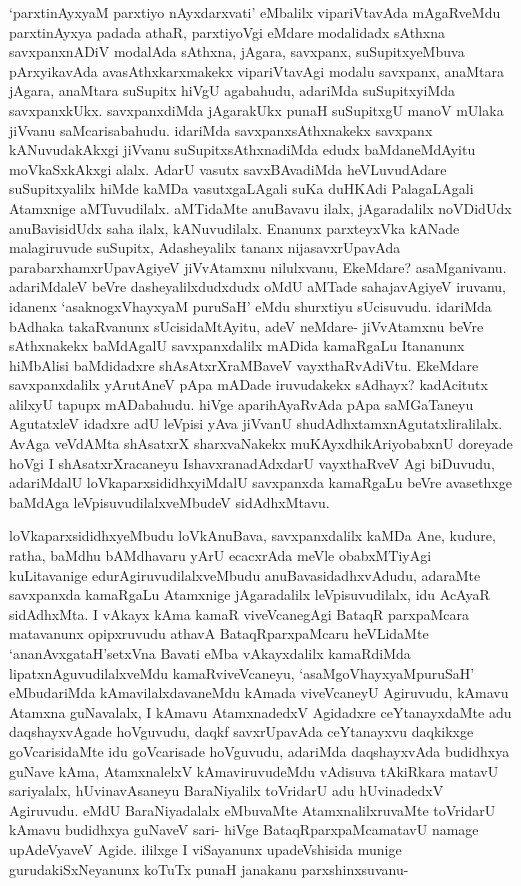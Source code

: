 \begin{artha}
`parxtinAyxyaM parxtiyo nAyxdarxvati' eMbalilx vipariVtavAda mAgaRveMdu parxtinAyxya padada athaR, parxtiyoVgi eMdare modalidadx sAthxna savxpanxnADiV modalAda sAthxna, jAgara, savxpanx, suSupitxyeMbuva pArxyikavAda avasAthxkarxmakekx vipariVtavAgi modalu savxpanx, anaMtara jAgara, anaMtara suSupitx hiVgU agabahudu, adariMda suSupitxyiMda savxpanxkUkx. savxpanxdiMda jAgarakUkx punaH suSupitxgU manoV mUlaka jiVvanu saMcarisabahudu. idariMda savxpanxsAthxnakekx savxpanx kANuvudakAkxgi jiVvanu suSupitxsAthxnadiMda edudx baMdaneMdAyitu moVkaSxkAkxgi alalx. AdarU vasutx savxBAvadiMda heVLuvudAdare suSupitxyalilx hiMde kaMDa vasutxgaLAgali suKa duHKAdi PalagaLAgali Atamxnige aMTuvudilalx. aMTidaMte anuBavavu ilalx, jAgaradalilx noVDidUdx anuBavisidUdx saha ilalx, kANuvudilalx. Enanunx parxteyxVka kANade malagiruvude suSupitx, Adasheyalilx tananx nijasavxrUpavAda parabarxhamxrUpavAgiyeV jiVvAtamxnu nilulxvanu, EkeMdare? asaMganivanu. adariMdaleV beVre dasheyalilxdudxdudx oMdU aMTade sahajavAgiyeV iruvanu, idanenx `asaknogxVhayxyaM puruSaH' eMdu shurxtiyu sUcisuvudu. idariMda bAdhaka takaRvanunx sUcisidaMtAyitu, adeV neMdare- jiVvAtamxnu beVre sAthxnakekx baMdAgalU savxpanxdalilx mADida kamaRgaLu Itananunx hiMbAlisi baMdidadxre shAsAtxrXraMBaveV vayxthaRvAdiVtu. EkeMdare savxpanxdalilx yArutAneV pApa mADade iruvudakekx sAdhayx? kadAcitutx alilxyU tapupx mADabahudu. hiVge aparihAyaRvAda pApa saMGaTaneyu AgutatxleV idadxre adU leVpisi yAva jiVvanU shudAdhxtamxnAgutatxliralilalx. AvAga veVdAMta shAsatxrX sharxvaNakekx muKAyxdhikAriyobabxnU doreyade hoVgi I shAsatxrXracaneyu IshavxranadAdxdarU vayxthaRveV Agi biDuvudu, adariMdalU loVkaparxsididhxyiMdalU savxpanxda kamaRgaLu beVre avasethxge baMdAga leVpisuvudilalxveMbudeV sidAdhxMtavu.
\end{artha}%

\begin{artha}
loVkaparxsididhxyeMbudu loVkAnuBava, savxpanxdalilx kaMDa Ane, kudure, ratha, baMdhu bAMdhavaru yArU ecacxrAda meVle obabxMTiyAgi kuLitavanige edurAgiruvudilalxveMbudu anuBavasidadhxvAdudu, adaraMte savxpanxda kamaRgaLu Atamxnige jAgaradalilx leVpisuvudilalx, idu AcAyaR sidAdhxMta. I vAkayx kAma kamaR viveVcanegAgi BataqR parxpaMcara matavanunx opipxruvudu athavA BataqRparxpaMcaru heVLidaMte `ananAvxgataH'setxVna Bavati eMba vAkayxdalilx kamaRdiMda lipatxnAguvudilalxveMdu kamaRviveVcaneyu, `asaMgoVhayxyaMpuruSaH' eMbudariMda kAmavilalxdavaneMdu kAmada viveVcaneyU Agiruvudu, kAmavu Atamxna guNavalalx, I kAmavu AtamxnadedxV Agidadxre ceYtanayxdaMte adu daqshayxvAgade hoVguvudu, daqkf savxrUpavAda ceYtanayxvu daqkikxge goVcarisidaMte idu goVcarisade hoVguvudu, adariMda daqshayxvAda budidhxya guNave kAma, AtamxnalelxV kAmaviruvudeMdu vAdisuva tAkiRkara matavU sariyalalx, hUvinavAsaneyu BaraNiyalilx toVridarU adu hUvinadedxV Agiruvudu. eMdU BaraNiyadalalx eMbuvaMte AtamxnalilxruvaMte toVridarU kAmavu budidhxya guNaveV sari- hiVge BataqRparxpaMcamatavU namage upAdeVyaveV Agide. ililxge I viSayanunx upadeVshisida munige gurudakiSxNeyanunx koTuTx punaH janakanu parxshinxsuvanu-
\end{artha}%

